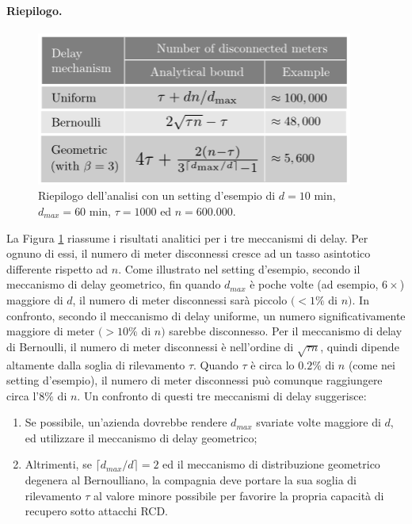 \paragraph{Riepilogo.}
\begin{figure}[hbtp]
	\centering
	\includegraphics[scale=.5]{imgs/attack/dist_perf.png}
	\caption{Riepilogo dell'analisi con un setting d'esempio di $d = 10$ min, $d_{max} = 60$ min, $\tau = 1000$ ed $n = 600.000$.}
	\label{dist_perf_img}
\end{figure}
La Figura \ref{dist_perf_img} riassume i risultati analitici per i tre meccanismi di delay. Per ognuno di essi, il numero di meter disconnessi cresce ad un tasso asintotico differente rispetto ad $n$. Come illustrato nel setting d'esempio, secondo il meccanismo di delay geometrico, fin quando $d_{max}$ è poche volte (ad esempio, $6\times$) maggiore di $d$, il numero di meter disconnessi sarà piccolo $(< 1\%$ di $n)$. In confronto, secondo il meccanismo di delay uniforme, un numero significativamente maggiore di meter $(> 10\%$ di $n)$ sarebbe disconnesso. Per il meccanismo di delay di Bernoulli, il numero di meter disconnessi è nell'ordine di $\sqrt{\tau n}$, quindi dipende altamente dalla soglia di rilevamento $\tau$. Quando $\tau$ è circa lo $0.2\%$ di $n$ (come nei setting d'esempio), il numero di meter disconnessi può comunque raggiungere circa l'$8\%$ di $n$. Un confronto di questi tre meccanismi di delay suggerisce:
\begin{enumerate}
	\item Se possibile, un'azienda dovrebbe rendere $d_{max}$ svariate volte maggiore di $d$, ed utilizzare il meccanismo di delay geometrico;
	\item Altrimenti, se $\lceil d_{max}/d \rceil = 2$ ed il meccanismo di distribuzione geometrico degenera al Bernoulliano, la compagnia deve portare la sua soglia di rilevamento $\tau$ al valore minore possibile per favorire la propria capacità di recupero sotto attacchi RCD.
\end{enumerate}
